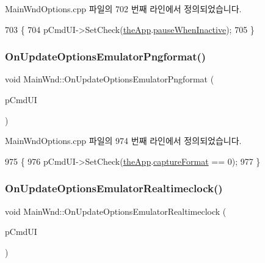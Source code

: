 Main\+Wnd\+Options.\+cpp 파일의 702 번째 라인에서 정의되었습니다.


\begin{DoxyCode}
703 \{
704   pCmdUI->SetCheck(\mbox{\hyperlink{_v_b_a_8cpp_a8095a9d06b37a7efe3723f3218ad8fb3}{theApp}}.\mbox{\hyperlink{class_v_b_a_a77e9763291376839d4c1e5eff00604b5}{pauseWhenInactive}});
705 \}
\end{DoxyCode}
\mbox{\label{class_main_wnd_aaf6f0e9673e24e2137d2bdf8527a2a1a}} 
\subsubsection{\texorpdfstring{On\+Update\+Options\+Emulator\+Pngformat()}{OnUpdateOptionsEmulatorPngformat()}}
{\footnotesize\ttfamily void Main\+Wnd\+::\+On\+Update\+Options\+Emulator\+Pngformat (\begin{DoxyParamCaption}\item[{C\+Cmd\+UI $\ast$}]{p\+Cmd\+UI }\end{DoxyParamCaption})\hspace{0.3cm}{\ttfamily [protected]}}



Main\+Wnd\+Options.\+cpp 파일의 974 번째 라인에서 정의되었습니다.


\begin{DoxyCode}
975 \{
976   pCmdUI->SetCheck(\mbox{\hyperlink{_v_b_a_8cpp_a8095a9d06b37a7efe3723f3218ad8fb3}{theApp}}.\mbox{\hyperlink{class_v_b_a_a103f0b25433c57c4458a208a06799cf8}{captureFormat}} == 0);
977 \}
\end{DoxyCode}
\mbox{\label{class_main_wnd_a0db3f50e5b656ca0d67ddfeccfbd4dba}} 
\subsubsection{\texorpdfstring{On\+Update\+Options\+Emulator\+Realtimeclock()}{OnUpdateOptionsEmulatorRealtimeclock()}}
{\footnotesize\ttfamily void Main\+Wnd\+::\+On\+Update\+Options\+Emulator\+Realtimeclock (\begin{DoxyParamCaption}\item[{C\+Cmd\+UI $\ast$}]{p\+Cmd\+UI }\end{DoxyParamCaption})\hspace{0.3cm}{\ttfamily [protected]}}



